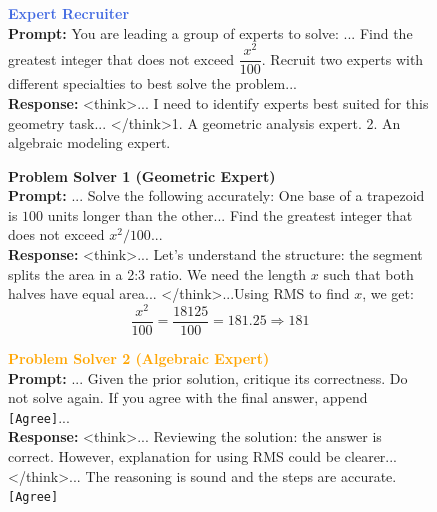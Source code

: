 \begin{figure}[t]
\centering
\begin{tcolorbox}[
  enhanced,
  title=Multi-agent Collaborative Reasoning Trace,
  colback=white,              
  colframe=black,             
  colbacktitle=gray!20,       
  coltitle=black,             
  fonttitle=\bfseries,        
  boxrule=0.8pt,              
  sharp corners,
  left=2pt, right=2pt, top=1pt, bottom=1pt
]
\scriptsize

\begin{tcolorbox}[
  enhanced,
  colback=white,
  colframe=royalblue,
  boxrule=0.5pt,
  sharp corners,
  left=1pt, right=1pt, top=1pt, bottom=1pt
]
\textcolor{royalblue}{\textbf{Expert Recruiter}} \\
\textbf{Prompt:} You are leading a group of experts to solve: ... Find the greatest integer that does not exceed $\dfrac{x^2}{100}$. Recruit two experts with different specialties to best solve the problem... \\
\textbf{Response:}
\textless think\textgreater\space ... I need to identify experts best suited for this geometry task... \textless/think\textgreater 1. A geometric analysis expert. 2. An algebraic modeling expert.
\end{tcolorbox}

\begin{tcolorbox}[
  enhanced,
  colback=white,
  colframe=olivegreen,
  boxrule=0.5pt,
  sharp corners,
  left=1pt, right=1pt, top=1pt, bottom=1pt
]
\textcolor{olivegreen}{\textbf{Problem Solver 1 (Geometric Expert)}} \\
\textbf{Prompt:} ... Solve the following accurately: One base of a trapezoid is $100$ units longer than the other... Find the greatest integer that does not exceed $x^2/100$... \\
\textbf{Response:}
\textless think\textgreater\space ... Let’s understand the structure: the segment splits the area in a 2:3 ratio. We need the length $x$ such that both halves have equal area... \textless/think\textgreater ...Using RMS to find $x$, we get:
\[
\frac{x^2}{100} = \frac{18125}{100} = 181.25 \Rightarrow \boxed{181}
\]
\end{tcolorbox}

\begin{tcolorbox}[
  enhanced,
  colback=white,
  colframe=orange,
  boxrule=0.5pt,
  sharp corners,
  left=1pt, right=1pt, top=1pt, bottom=1pt
]
\textcolor{orange}{\textbf{Problem Solver 2 (Algebraic Expert)}} \\
\textbf{Prompt:} ... Given the prior solution, critique its correctness. Do not solve again. If you agree with the final answer, append \texttt{[Agree]}... \\
\textbf{Response:}
\textless think\textgreater\space ... Reviewing the solution: the answer is correct. However, explanation for using RMS could be clearer... \textless/think\textgreater ... The reasoning is sound and the steps are accurate. \texttt{[Agree]}
\end{tcolorbox}


\end{tcolorbox}
\end{figure}
